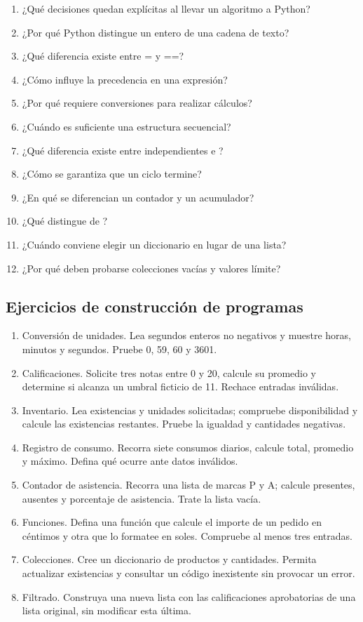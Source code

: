 \begin{enumerate}
\item ¿Qué decisiones quedan explícitas al llevar un algoritmo a Python?
\item ¿Por qué Python distingue un entero de una cadena de texto?
\item ¿Qué diferencia existe entre = y ==?
\item ¿Cómo influye la precedencia en una expresión?
\item ¿Por qué  requiere conversiones para realizar cálculos?
\item ¿Cuándo es suficiente una estructura secuencial?
\item ¿Qué diferencia existe entre  independientes e ?
\item ¿Cómo se garantiza que un ciclo  termine?
\item ¿En qué se diferencian un contador y un acumulador?
\item ¿Qué distingue  de ?
\item ¿Cuándo conviene elegir un diccionario en lugar de una lista?
\item ¿Por qué deben probarse colecciones vacías y valores límite?
\end{enumerate}

\subsection{Ejercicios de construcción de programas}

\begin{enumerate}
\item Conversión de unidades. Lea segundos enteros no negativos y muestre horas, minutos y segundos. Pruebe 0, 59, 60 y 3601.
\item Calificaciones. Solicite tres notas entre 0 y 20, calcule su promedio y determine si alcanza un umbral ficticio de 11. Rechace entradas inválidas.
\item Inventario. Lea existencias y unidades solicitadas; compruebe disponibilidad y calcule las existencias restantes. Pruebe la igualdad y cantidades negativas.
\item Registro de consumo. Recorra siete consumos diarios, calcule total, promedio y máximo. Defina qué ocurre ante datos inválidos.
\item Contador de asistencia. Recorra una lista de marcas P y A; calcule presentes, ausentes y porcentaje de asistencia. Trate la lista vacía.
\item Funciones. Defina una función que calcule el importe de un pedido en céntimos y otra que lo formatee en soles. Compruebe al menos tres entradas.
\item Colecciones. Cree un diccionario de productos y cantidades. Permita actualizar existencias y consultar un código inexistente sin provocar un error.
\item Filtrado. Construya una nueva lista con las calificaciones aprobatorias de una lista original, sin modificar esta última.
\end{enumerate}

